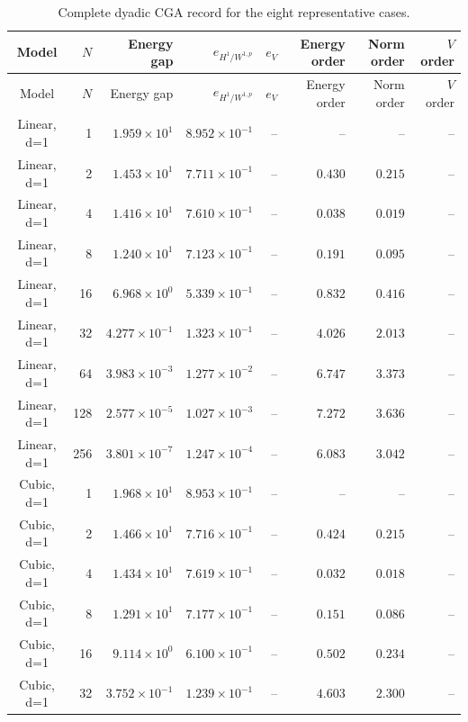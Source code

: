 \begin{longtable}{@{}crrrrrrr@{}}
\caption{Complete dyadic CGA record for the eight representative cases.}\label{tab:all-dyadic-cga}\\
\toprule
Model & $N$ & Energy gap & $e_{H^1/W^{1,p}}$ & $e_V$ & Energy order & Norm order & $V$ order \\ \midrule
\endfirsthead
\toprule
Model & $N$ & Energy gap & $e_{H^1/W^{1,p}}$ & $e_V$ & Energy order & Norm order & $V$ order \\ \midrule
\endhead
Linear, d=1 & 1 & $1.959\!\times\!10^{1}$ & $8.952\!\times\!10^{-1}$ & -- & -- & -- & -- \\
Linear, d=1 & 2 & $1.453\!\times\!10^{1}$ & $7.711\!\times\!10^{-1}$ & -- & $0.430$ & $0.215$ & -- \\
Linear, d=1 & 4 & $1.416\!\times\!10^{1}$ & $7.610\!\times\!10^{-1}$ & -- & $0.038$ & $0.019$ & -- \\
Linear, d=1 & 8 & $1.240\!\times\!10^{1}$ & $7.123\!\times\!10^{-1}$ & -- & $0.191$ & $0.095$ & -- \\
Linear, d=1 & 16 & $6.968\!\times\!10^{0}$ & $5.339\!\times\!10^{-1}$ & -- & $0.832$ & $0.416$ & -- \\
Linear, d=1 & 32 & $4.277\!\times\!10^{-1}$ & $1.323\!\times\!10^{-1}$ & -- & $4.026$ & $2.013$ & -- \\
Linear, d=1 & 64 & $3.983\!\times\!10^{-3}$ & $1.277\!\times\!10^{-2}$ & -- & $6.747$ & $3.373$ & -- \\
Linear, d=1 & 128 & $2.577\!\times\!10^{-5}$ & $1.027\!\times\!10^{-3}$ & -- & $7.272$ & $3.636$ & -- \\
Linear, d=1 & 256 & $3.801\!\times\!10^{-7}$ & $1.247\!\times\!10^{-4}$ & -- & $6.083$ & $3.042$ & -- \\
Cubic, d=1 & 1 & $1.968\!\times\!10^{1}$ & $8.953\!\times\!10^{-1}$ & -- & -- & -- & -- \\
Cubic, d=1 & 2 & $1.466\!\times\!10^{1}$ & $7.716\!\times\!10^{-1}$ & -- & $0.424$ & $0.215$ & -- \\
Cubic, d=1 & 4 & $1.434\!\times\!10^{1}$ & $7.619\!\times\!10^{-1}$ & -- & $0.032$ & $0.018$ & -- \\
Cubic, d=1 & 8 & $1.291\!\times\!10^{1}$ & $7.177\!\times\!10^{-1}$ & -- & $0.151$ & $0.086$ & -- \\
Cubic, d=1 & 16 & $9.114\!\times\!10^{0}$ & $6.100\!\times\!10^{-1}$ & -- & $0.502$ & $0.234$ & -- \\
Cubic, d=1 & 32 & $3.752\!\times\!10^{-1}$ & $1.239\!\times\!10^{-1}$ & -- & $4.603$ & $2.300$ & -- \\

\end{longtable}
